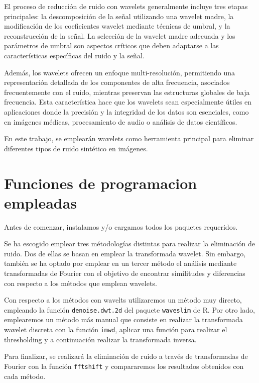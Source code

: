 \documentclass[
]{article}
\begin{document}
El proceso de reducción de ruido con wavelets generalmente incluye tres
etapas principales: la descomposición de la señal utilizando una wavelet
madre, la modificación de los coeficientes wavelet mediante técnicas de
umbral, y la reconstrucción de la señal. La selección de la wavelet
madre adecuada y los parámetros de umbral son aspectos críticos que
deben adaptarse a las características específicas del ruido y la señal.

Además, los wavelets ofrecen un enfoque multi-resolución, permitiendo
una representación detallada de los componentes de alta frecuencia,
asociados frecuentemente con el ruido, mientras preservan las
estructuras globales de baja frecuencia. Esta característica hace que
los wavelets sean especialmente útiles en aplicaciones donde la
precisión y la integridad de los datos son esenciales, como en imágenes
médicas, procesamiento de audio o análisis de datos científicos.

En este trabajo, se emplearán wavelets como herramienta principal para
eliminar diferentes tipos de ruido sintético en imágenes.

\section{Funciones de programacion
empleadas}\label{funciones-de-programacion-empleadas}

Antes de comenzar, instalamos y/o cargamos todos los paquetes
requeridos.

Se ha escogido emplear tres métodologías distintas para realizar la
eliminación de ruido. Dos de ellas se basan en emplear la transformada
wavelet. Sin embargo, también se ha optado por emplear en un tercer
método el análisis mediante transformadas de Fourier con el objetivo de
encontrar similitudes y diferencias con respecto a los métodos que
emplean wavelets.

Con respecto a los métodos con wavelts utilizaremos un método muy
directo, empleando la función \texttt{denoise.dwt.2d} del paquete
\texttt{waveslim} de R. Por otro lado, emplearemos un método más manual
que consiste en realizar la transformada wavelet discreta con la función
\texttt{imwd}, aplicar una función para realizar el thresholding y a
continuación realizar la transformada inversa.

Para finalizar, se realizará la eliminación de ruido a través de
transformadas de Fourier con la función \texttt{fftshift} y compararemos
los resultados obtenidos con cada método.
\end{document}
